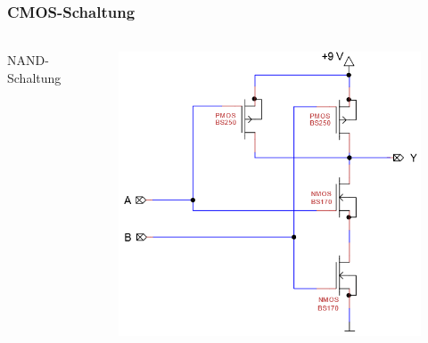 \begin{frame}
    \frametitle{CMOS-Schaltung}
    \framesubtitle{}
    \begin{columns}[c]
            \begin{center}
                \begin{block}{}
                        NAND-Schaltung
                \end{block}
            \end{center}
            \begin{figure}[H]
            \begin{center}
                    \includegraphics[scale=0.35]{./img/schaltung/1b_cmos.png}
            \end{center}
            \end{figure}    
    \end{columns}
\end{frame}

